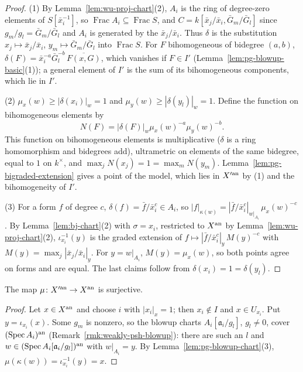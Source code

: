 \begin{proof}
(1) By Lemma~\ref{lem:wu-proj-chart}(2), $A_i$ is the ring of degree-zero elements of $S[\bar x_i^{-1}]$, so
$\operatorname{Frac}A_i\subseteq\operatorname{Frac}S$, and $C=k[\bar x_j/\bar x_i,\bar G_m/\bar G_l]$ since $g_m/g_l=\bar G_m/\bar G_l$ and $A_i$ is generated by the
$\bar x_j/\bar x_i$. Thus $\delta$ is the substitution $x_j\mapsto\bar x_j/\bar x_i$, $y_m\mapsto\bar G_m/\bar G_l$ into $\operatorname{Frac}S$. For $F$
bihomogeneous of bidegree $(a,b)$, $\delta(F)=\bar x_i^{-a}\bar G_l^{-b}\,\overline{F(x,G)}$, which vanishes if $F\in I'$
(Lemma~\ref{lem:pg-blowup-basic}(1)); a general element of $I'$ is the sum of its bihomogeneous components, which lie in $I'$.

(2) $\mu_x(w)\ge|\delta(x_i)|_w=1$ and $\mu_y(w)\ge|\delta(y_l)|_w=1$. Define the function on bihomogeneous elements by
\[
N(F)=|\delta(F)|_w\mu_x(w)^{-a}\mu_y(w)^{-b}.
\]
This function on bihomogeneous
elements is multiplicative ($\delta$ is a ring homomorphism and bidegrees add), ultrametric on elements of the same bidegree, equal to $1$
on $k^\times$, and $\max_jN(x_j)=1=\max_mN(y_m)$. Lemma~\ref{lem:pg-bigraded-extension} gives a point of the model, which lies in $X'^{\mathrm{an}}$ by
(1) and the bihomogeneity of $I'$.

(3) For a form $f$ of degree $c$, $\delta(f)=\bar f/\bar x_i^c\in A_i$, so $|f|_{\kappa(w)}=|\bar f/\bar x_i^c|_{w|_{A_i}}\,\mu_x(w)^{-c}$. By
Lemma~\ref{lem:bj-chart}(2) with $\sigma=x_i$, restricted to $X^{\mathrm{an}}$ by Lemma~\ref{lem:wu-proj-chart}(2), $\iota_{x_i}^{-1}(y)$ is the graded
extension of $f\mapsto|\bar f/\bar x_i^c|_y\,M(y)^{-c}$ with $M(y)=\max_j|\bar x_j/\bar x_i|_y$. For $y=w|_{A_i}$, $M(y)=\mu_x(w)$, so both points
agree on forms and are equal. The last claims follow from $\delta(x_i)=1=\delta(y_l)$.
\end{proof}

\begin{lemma}[Surjectivity]\label{lem:pg-blowup-surjective}
\leanok
{}
The map $\mu\colon X'^{\mathrm{an}}\to X^{\mathrm{an}}$ is surjective.
\end{lemma}

\begin{proof}
Let $x\in X^{\mathrm{an}}$ and choose $i$ with $|x_i|_x=1$; then $x_i\notin I$ and $x\in U_{x_i}$. Put $y=\iota_{x_i}(x)$. Some $g_m$ is nonzero, so
the blowup charts $A_i[\mathfrak a_i/g_l]$, $g_l\ne0$, cover $(\operatorname{Spec} A_i)^{\mathrm{an}}$ (Remark~\ref{rmk:weakly-psh-blowup}): there are such an $l$ and
$w\in(\operatorname{Spec} A_i[\mathfrak a_i/g_l])^{\mathrm{an}}$ with $w|_{A_i}=y$. By Lemma~\ref{lem:pg-blowup-chart}(3), $\mu(\kappa(w))=\iota_{x_i}^{-1}(y)=x$.
\end{proof}

